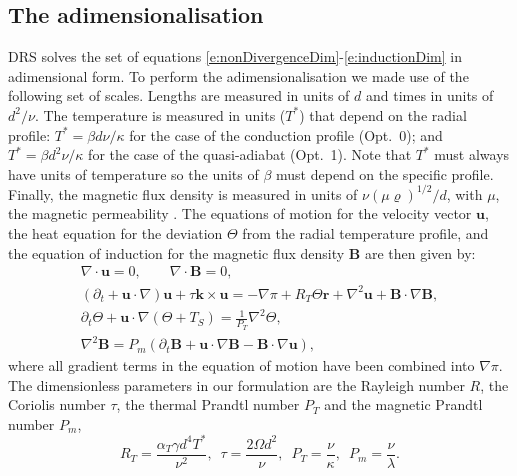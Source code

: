 \documentclass[a4paper,10pt]{book}
\renewcommand{\vec}[1]{\mathbf{#1}}
\begin{document}
\subsection{The adimensionalisation}
DRS solves the set of equations \ref{e:nonDivergenceDim}-\ref{e:inductionDim} in
adimensional form. To perform the adimensionalisation we made use of the
following set of scales. Lengths are measured in units of $d$ and times in units
of $d^2 / \nu$. The temperature is measured in units ($T^*$) that depend on the
radial profile: $T^* = \beta d \nu/\kappa$ for the case of the conduction
profile (Opt.~0); and $T^* = \beta d^2 \nu/\kappa$ for the case of the
quasi-adiabat (Opt.~1). Note that $T^*$ must always have units of temperature so
the units of $\beta$ must depend on the specific profile. Finally, the magnetic
flux density is measured in units of $\nu ( \mu \varrho )^{1/2} /d$, with $\mu$,
the magnetic permeability \citep{ArdesEtAl97}. The equations of motion for the
velocity vector $\vec u$, the heat equation for the deviation $\Theta$ from the
radial temperature profile, and the equation of induction for the magnetic flux
density $\vec B$ are then given by:
\begin{subequations}
\begin{gather}
\label{e:nonDivergence}
\nabla \cdot \vec u = 0, \qquad \nabla \cdot \vec B = 0, \\
\label{e:NavierStokes}
(\partial_t + \vec u \cdot \nabla )\vec u + \tau \vec k \times
\vec u = - \nabla \pi + R_T \Theta \vec{r} + \nabla^2 \vec u + \vec B \cdot
\nabla \vec B, \\
\label{e:temperature}
\partial_t \Theta + \vec u \cdot \nabla (\Theta+T_S) = \frac{1}{P_T} \nabla^2 \Theta, \\
\label{e:induction}
\nabla^2 \vec B =  P_m(\partial_t \vec B + \vec u \cdot \nabla \vec B
-  \vec B \cdot \nabla \vec u),
\end{gather}
\end{subequations}
where all gradient terms in the equation of motion have been combined into
$\nabla \pi$. The dimensionless parameters in our formulation are the Rayleigh
number $R$, the Coriolis number $\tau$, the thermal Prandtl number $P_T$ and the
magnetic Prandtl number $P_m$,
\begin{equation}
R_T  = \frac{\alpha_T \gamma d^4 T^*}{\nu^2}, \enspace
\tau = \frac{2\Omega d^2}{\nu} , \enspace
P_T  = \frac{\nu}{\kappa} , \enspace
P_m  = \frac{\nu}{\lambda}.
\end{equation}
\end{document}
